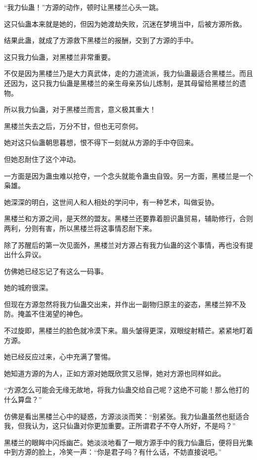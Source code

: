 
\begin{this_body}



“我力仙蛊！”方源的动作，顿时让黑楼兰心头一跳。

这只仙蛊本来就是她的，但因为她渡劫失败，沉迷在梦境当中，后被方源所救。

结果此蛊，就成了方源救下黑楼兰的报酬，交到了方源的手中。

这只我力仙蛊，对黑楼兰非常重要。

不仅是因为黑楼兰乃是大力真武体，走的力道流派，我力仙蛊最适合黑楼兰。而且还因为，这只我力仙蛊是黑楼兰的亲生母亲苏仙儿炼制，是其母留给黑楼兰的遗物。

所以我力仙蛊，对于黑楼兰而言，意义极其重大！

黑楼兰失去之后，万分不甘，但也无可奈何。

她对这只仙蛊朝思暮想，恨不得下一刻就从方源的手中夺回来。

但她忍耐住了这个冲动。

一方面是因为蛊虫难以抢夺，一个念头就能令蛊虫自毁。另一方面，黑楼兰是一个枭雄。

她深深的明白，这世间人和人相处的学问中，有一种艺术，叫做妥协。

黑楼兰和方源之间，是天然的盟友。黑楼兰还要靠着胆识蛊贸易，辅助修行，合则两利，分则有害，所以黑楼兰将这事情忍耐下来。

除了苏醒后的第一次见面外，黑楼兰对方源占有我力仙蛊的这个事情，再也没有提出什么异议。

仿佛她已经忘记了有这么一码事。

她的城府很深。

但现在方源忽然将我力仙蛊交出来，并作出一副物归原主的姿态，黑楼兰猝不及防。掩盖不住渴望的神色。

不过旋即，黑楼兰的脸色就冷漠下来。眉头皱得更深，双眼绽射精芒。紧紧地盯着方源。

她已经反应过来，心中充满了警惕。

她知道方源的为人，正如方源对她既欣赏又忌惮，她对方源也同样如此。

“方源怎么可能会无缘无故地，将我力仙蛊交给自己呢？这绝不可能！那么他打的什么算盘？”

仿佛是看出黑楼兰心中的疑惑，方源淡淡而笑：“别紧张。我力仙蛊虽然也挺适合我，但我认为，这只仙蛊对你更加重要。正所谓君子不夺人所好，不是吗？”

黑楼兰的眼眸中闪烁幽芒。她淡淡地看了一眼方源手中的我力仙蛊后，便将目光集中到方源的脸上，冷笑一声：“你是君子吗？有什么话，不妨直接说吧。”


\end{this_body}
